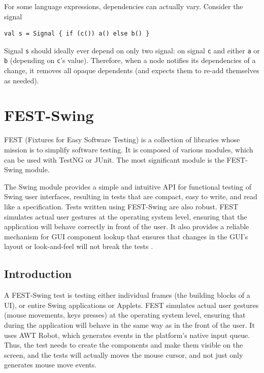 For some language expressions, dependencies can actually vary. Consider the signal
\begin{lstlisting}
val s = Signal { if (c()) a() else b() }
\end{lstlisting}
Signal \texttt{s} should ideally ever depend on only two signal: on signal \texttt{c} and either \texttt{a} or \texttt{b} (depending on \texttt{c}'s value). Therefore, when a node notifies its dependencies of a change, it removes all opaque dependents (and expects them to re-add themselves as needed).








\section{FEST-Swing}\label{sec:theory_fest-swing}

FEST (Fixtures for Easy Software Testing) is a collection of libraries whose mission is to simplify software testing. It is composed of various modules, which can be used with TestNG or JUnit. The most significant module is the FEST-Swing module.

The Swing module provides a simple and intuitive API for functional testing of Swing user interfaces, resulting in tests that are compact, easy to write, and read like a specification. Tests written using FEST-Swing are also robust. FEST simulates actual user gestures at the operating system level, ensuring that the application will behave correctly in front of the user. It also provides a reliable mechanism for GUI component lookup that ensures that changes in the GUI's layout or look-and-feel will not break the tests \cite{FESTMain}.

\subsection{Introduction}

A FEST-Swing test is testing either individual frames (the building blocks of a UI), or entire Swing applications or Applets. FEST simulates actual user gestures (mouse movements, keys presses) at the operating system level, ensuring that during the application will behave in the same way as in the front of the user. It uses AWT Robot, which generates events in the platform's native input queue. Thus, the test needs to create the components and make them visible on the screen, and the tests will actually moves the mouse cursor, and not just only generates mouse move events.

